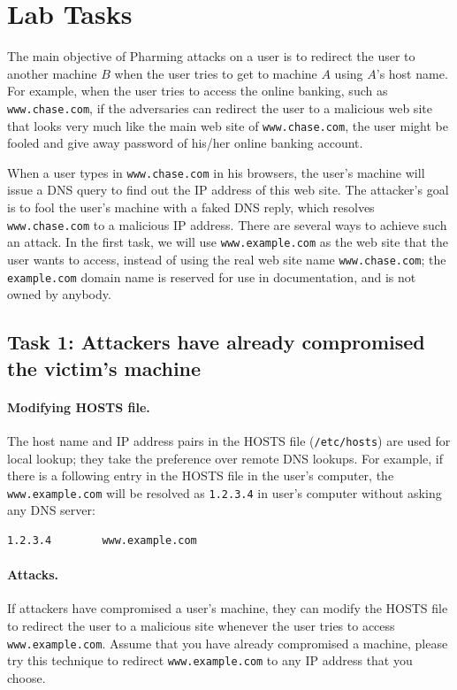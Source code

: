\section{Lab Tasks}


The main objective of Pharming attacks on a user is to redirect the user
to another machine $B$ when the user tries to get to machine $A$ using
$A$'s host name. For example, when the user tries to access the online banking,
such as {\tt www.chase.com}, if the adversaries can redirect the user 
to a malicious web site that looks very much like the main web site 
of {\tt www.chase.com}, the user might be fooled and give away password
of his/her online banking account.

When a user types in {\tt www.chase.com} in his browsers, the user's machine will issue
a DNS query to find out the IP address of this web site. The attacker's goal
is to fool the user's machine with a faked DNS reply, which resolves
{\tt www.chase.com} to a malicious IP address. There are several ways
to achieve such an attack. In the first task, we will 
use {\tt www.example.com} as the web site that the user wants to access,
instead of using the real web site name {\tt www.chase.com}; 
the {\tt example.com} domain name is reserved for use in 
documentation, and is not owned by anybody. 


\subsection{Task 1: Attackers have already compromised the victim's machine}

\paragraph{Modifying HOSTS file.}
The host name and IP address pairs in the HOSTS file (\texttt{/etc/hosts}) 
are used for local lookup; they take the preference over 
remote DNS lookups. For example, if there is a following 
entry in the HOSTS file in the user's computer, 
the \texttt{www.example.com} will be resolved as \texttt{1.2.3.4} in 
user's computer without asking any DNS server:
\begin{verbatim}
1.2.3.4        www.example.com
\end{verbatim}

\paragraph{Attacks.}
If attackers have compromised a user's machine, they can 
modify the HOSTS file to redirect the user to a malicious site
whenever the user tries to access {\tt www.example.com}. Assume that you have 
already compromised a machine, please try this technique to redirect
{\tt www.example.com} to any IP address that you choose.

